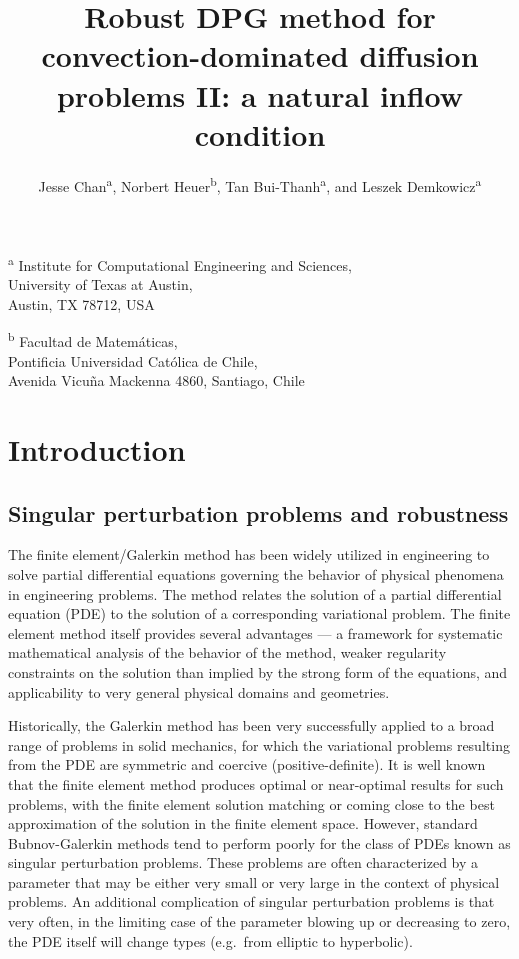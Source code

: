 \documentclass[11pt,onecolumn]{scrartcl}
\author{Jesse Chan\textsuperscript{a}, Norbert Heuer\textsuperscript{b}, Tan Bui-Thanh\textsuperscript{a}, and Leszek Demkowicz\textsuperscript{a}}
\title{Robust DPG method for convection-dominated diffusion problems II: a natural inflow condition}
\date{}
\begin{document}
\maketitle
\begin{center}
\textsuperscript{a} Institute for Computational Engineering and Sciences, \\University of Texas at Austin, \\Austin, TX 78712, USA\\
\end{center}

\begin{center}
\textsuperscript{b} Facultad de Matem\'aticas, \\Pontificia Universidad Cat\'olica de Chile,\\
Avenida Vicu\~na Mackenna 4860, Santiago, Chile
\end{center}

\section{Introduction}

\subsection{Singular perturbation problems and robustness}

The finite element/Galerkin method has been widely utilized in engineering to solve partial differential equations governing the behavior of physical phenomena in engineering problems.  The method relates the solution of a partial differential equation (PDE) to the solution of a corresponding variational problem. The finite element method itself provides several advantages --- a framework for systematic mathematical analysis of the behavior of the method, weaker regularity constraints on the solution than implied by the strong form of the equations, and applicability to very general physical domains and geometries. 

Historically, the Galerkin method has been very successfully applied to a broad range of problems in solid mechanics, for which the variational problems resulting from the PDE are symmetric and coercive (positive-definite). It is well known that the finite element method produces optimal or near-optimal results for such problems, with the finite element solution matching or coming close to the best approximation of the solution in the finite element space. However, standard Bubnov-Galerkin methods tend to perform poorly for the class of PDEs known as singular perturbation problems. These problems are often characterized by a parameter that may be either very small or very large in the context of physical problems.  An additional complication of singular perturbation problems is that very often, in the limiting case of the parameter blowing up or decreasing to zero, the PDE itself will change types (e.g.\ from elliptic to hyperbolic).
\end{document}
